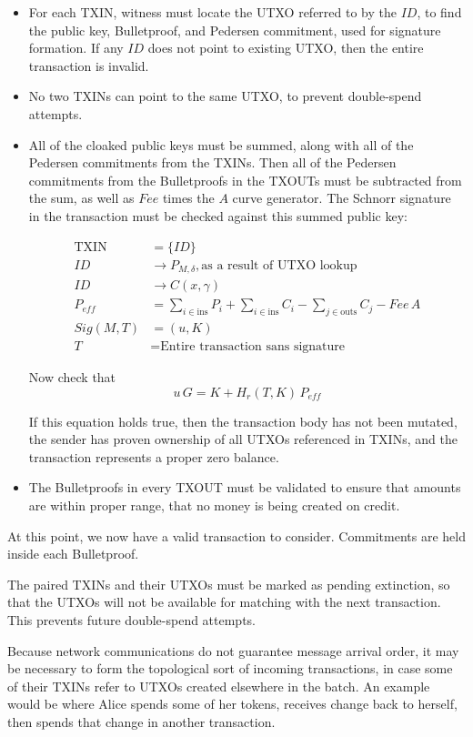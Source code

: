 \documentclass[a4paper, 10pt, conference]{ieeeconf}
\begin{document}
\begin{itemize}
	\item{For each TXIN, witness must locate the UTXO referred to by the $ID$, to find the public key, Bulletproof, and Pedersen commitment, used for signature formation. If any $ID$ does not point to existing UTXO, then the entire transaction is invalid.}
	\item{No two TXINs can point to the same UTXO, to prevent double-spend attempts.}
	\item{All of the cloaked public keys must be summed, along with all of the Pedersen commitments from the TXINs. Then all of the Pedersen commitments from the Bulletproofs in the TXOUTs must be subtracted from the sum, as well as $Fee$ times the $A$ curve generator. The Schnorr signature in the transaction must be checked against this summed public key:

	\begin{align*}
		\text{TXIN} &= \{ID\} \\
		ID &\rightarrow P_{M, \delta}, \text{as a result of UTXO lookup}\\
		ID &\rightarrow C(x, \gamma)\\
		P_{eff} &= \sum_{i \in \text{ins}}{P_i} + \sum_{i \in \text{ins}}{C_i}  - \sum_{j \in \text{outs}}{C_j} - Fee\,A\\
		Sig(M, T) &= (u, K)\\
		T &= \text{Entire transaction sans signature}
	\end{align*}

	Now check that
	$$u \, G = K + H_r(T, K) \, P_{eff}$$
	
	If this equation holds true, then the transaction body has not been mutated, the sender has proven ownership of all UTXOs referenced in TXINs, and the transaction represents a proper zero balance.}
	\item{The Bulletproofs in every TXOUT must be validated to ensure that amounts are within proper range, that no money is being created on credit.}
\end{itemize}

At this point, we now have a valid transaction to consider. Commitments are held inside each Bulletproof.

The paired TXINs and their UTXOs must be marked as pending extinction, so that the UTXOs will not be available for matching with the next transaction. This prevents future double-spend attempts.

Because network communications do not guarantee message arrival order, it may be necessary to form the topological sort of incoming transactions, in case some of their TXINs refer to UTXOs created elsewhere in the batch. An example would be where Alice spends some of her tokens, receives change back to herself, then spends that change in another transaction.
\end{document}
